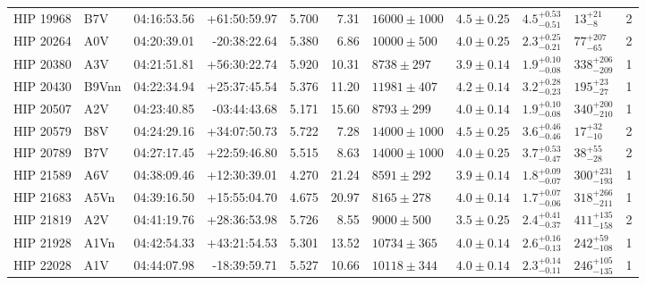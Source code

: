 \begin{landscape}
\begin{scriptsize}
\begin{longtable}{|l|lrrrrlllll|}
   HIP 19968 &      B7V &    04:16:53.56 &   +61:50:59.97 &   5.700 &      7.31 &  $16000 \pm 1000$ &  $4.5 \pm 0.25$ &  $4.5^{+0.53}_{-0.51}$ &       $13^{+21}_{-8}$ &       2 \\
   HIP 20264 &      A0V &    04:20:39.01 &   -20:38:22.64 &   5.380 &      6.86 &   $10000 \pm 500$ &  $4.0 \pm 0.25$ &  $2.3^{+0.25}_{-0.21}$ &     $77^{+207}_{-65}$ &       2 \\
   HIP 20380 &      A3V &    04:21:51.81 &   +56:30:22.74 &   5.920 &     10.31 &    $8738 \pm 297$ &  $3.9 \pm 0.14$ &  $1.9^{+0.10}_{-0.08}$ &   $338^{+206}_{-209}$ &       1 \\
   HIP 20430 &    B9Vnn &    04:22:34.94 &   +25:37:45.54 &   5.376 &     11.20 &   $11981 \pm 407$ &  $4.2 \pm 0.14$ &  $3.2^{+0.28}_{-0.23}$ &     $195^{+23}_{-27}$ &       1 \\
   HIP 20507 &      A2V &    04:23:40.85 &   -03:44:43.68 &   5.171 &     15.60 &    $8793 \pm 299$ &  $4.0 \pm 0.14$ &  $1.9^{+0.10}_{-0.08}$ &   $340^{+200}_{-210}$ &       1 \\
   HIP 20579 &      B8V &    04:24:29.16 &   +34:07:50.73 &   5.722 &      7.28 &  $14000 \pm 1000$ &  $4.5 \pm 0.25$ &  $3.6^{+0.46}_{-0.46}$ &      $17^{+32}_{-10}$ &       2 \\
   HIP 20789 &      B7V &    04:27:17.45 &   +22:59:46.80 &   5.515 &      8.63 &  $14000 \pm 1000$ &  $4.0 \pm 0.25$ &  $3.7^{+0.53}_{-0.47}$ &      $38^{+55}_{-28}$ &       2 \\
   HIP 21589 &      A6V &    04:38:09.46 &   +12:30:39.01 &   4.270 &     21.24 &    $8591 \pm 292$ &  $3.9 \pm 0.14$ &  $1.8^{+0.09}_{-0.07}$ &   $300^{+231}_{-193}$ &       1 \\
   HIP 21683 &     A5Vn &    04:39:16.50 &   +15:55:04.70 &   4.675 &     20.97 &    $8165 \pm 278$ &  $4.0 \pm 0.14$ &  $1.7^{+0.07}_{-0.06}$ &   $318^{+266}_{-211}$ &       1 \\
   HIP 21819 &      A2V &    04:41:19.76 &   +28:36:53.98 &   5.726 &      8.55 &    $9000 \pm 500$ &  $3.5 \pm 0.25$ &  $2.4^{+0.41}_{-0.37}$ &   $411^{+135}_{-158}$ &       2 \\
   HIP 21928 &     A1Vn &    04:42:54.33 &   +43:21:54.53 &   5.301 &     13.52 &   $10734 \pm 365$ &  $4.0 \pm 0.14$ &  $2.6^{+0.16}_{-0.13}$ &    $242^{+59}_{-108}$ &       1 \\
   HIP 22028 &      A1V &    04:44:07.98 &   -18:39:59.71 &   5.527 &     10.66 &   $10118 \pm 344$ &  $4.0 \pm 0.14$ &  $2.3^{+0.14}_{-0.11}$ &   $246^{+105}_{-135}$ &       1 \\

\end{longtable}
\end{scriptsize}
\end{landscape}
